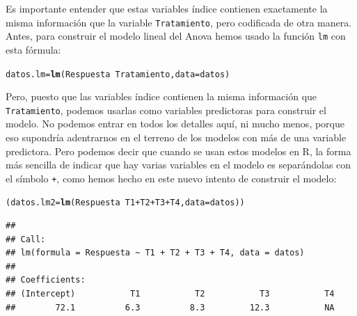 \documentclass[10pt,a4paper]{article}\usepackage[]{graphicx}\usepackage[]{color}
\makeatletter
\newcommand{\hlopt}[1]{\textcolor[rgb]{0,0,0}{#1}}%
\newcommand{\hlstd}[1]{\textcolor[rgb]{0.345,0.345,0.345}{#1}}%
\newcommand{\hlkwb}[1]{\textcolor[rgb]{0.69,0.353,0.396}{#1}}%
\newcommand{\hlkwc}[1]{\textcolor[rgb]{0.333,0.667,0.333}{#1}}%
\newcommand{\hlkwd}[1]{\textcolor[rgb]{0.737,0.353,0.396}{\textbf{#1}}}%
\newenvironment{kframe}{%
 \def\at@end@of@kframe{}%
 \ifinner\ifhmode%
  \def\at@end@of@kframe{\end{minipage}}%
  \begin{minipage}{\columnwidth}%
 \fi\fi%
 \def\FrameCommand##1{\hskip\@totalleftmargin \hskip-\fboxsep
 \colorbox{shadecolor}{##1}\hskip-\fboxsep
     \hskip-\linewidth \hskip-\@totalleftmargin \hskip\columnwidth}%
 \MakeFramed {\advance\hsize-\width
   \@totalleftmargin\z@ \linewidth\hsize
   \@setminipage}}%
 {\par\unskip\endMakeFramed%
 \at@end@of@kframe}
\newenvironment{knitrout}{}{} %
\newcounter {cont01}
\makeatother
\begin{document}
Es importante entender que estas variables índice contienen exactamente la misma información que la variable {\tt Tratamiento}, pero codificada de otra manera. Antes, para construir el modelo lineal del Anova hemos usado la función {\tt lm} con esta fórmula:
\begin{knitrout}
\color{fgcolor}\begin{kframe}
\begin{alltt}
\hlstd{datos.lm} \hlkwb{=} \hlkwd{lm}\hlstd{(Respuesta} \hlopt{~} \hlstd{Tratamiento,} \hlkwc{data} \hlstd{= datos)}
\end{alltt}
\end{kframe}
\end{knitrout}
Pero, puesto que las variables índice contienen la misma información que {\tt Tratamiento}, podemos usarlas como variables predictoras para construir el modelo. No podemos entrar en todos los detalles aquí, ni mucho menos, porque eso supondría adentrarnos en el terreno de los modelos con más de una variable predictora. Pero podemos decir que cuando se usan estos modelos en R, la forma más sencilla de indicar que hay varias variables en el modelo es separándolas con el símbolo {\tt +}, como hemos hecho en este nuevo intento de construir el modelo:

\begin{knitrout}
\color{fgcolor}\begin{kframe}
\begin{alltt}
\hlstd{(datos.lm2} \hlkwb{=} \hlkwd{lm}\hlstd{(Respuesta} \hlopt{~} \hlstd{T1} \hlopt{+} \hlstd{T2} \hlopt{+} \hlstd{T3} \hlopt{+} \hlstd{T4,} \hlkwc{data} \hlstd{= datos))}
\end{alltt}
\begin{verbatim}
## 
## Call:
## lm(formula = Respuesta ~ T1 + T2 + T3 + T4, data = datos)
## 
## Coefficients:
## (Intercept)           T1           T2           T3           T4  
##        72.1          6.3          8.3         12.3           NA
\end{verbatim}
\end{kframe}
\end{knitrout}
\end{document}
